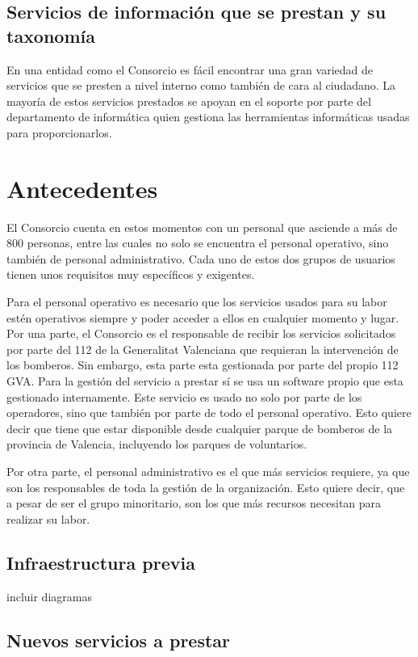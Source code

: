 \documentclass[12pt,a4paper,titlepage,twoside]{report}
\begin{document}
\section{Servicios de información que se prestan y su taxonomía}
En una entidad como el Consorcio es fácil encontrar una gran variedad de servicios que se presten a nivel interno como también de cara al ciudadano. La mayoría de estos servicios prestados se apoyan en el soporte por parte del departamento de informática quien gestiona las herramientas informáticas usadas para proporcionarlos.

\chapter{Antecedentes}
El Consorcio cuenta en estos momentos con un personal que asciende a más de 800 personas, entre las cuales no solo se encuentra el personal operativo, sino también de personal administrativo. Cada uno de estos dos grupos de usuarios tienen unos requisitos muy específicos y exigentes. 
\par
Para el personal operativo es necesario que los servicios usados para su labor estén operativos siempre y poder acceder a ellos en cualquier momento y lugar. Por una parte, el Consorcio es el responsable de recibir los servicios solicitados por parte del 112 de la Generalitat Valenciana que requieran la intervención de los bomberos. Sin embargo, esta parte esta gestionada por parte del propio 112 GVA. Para la gestión del servicio a prestar sí se usa un software propio que esta gestionado internamente. Este servicio es usado no solo por parte de los operadores, sino que también por parte de todo el personal operativo. Esto quiere decir que tiene que estar disponible desde cualquier parque de bomberos de la provincia de Valencia, incluyendo los parques de voluntarios.
\par
Por otra parte, el personal administrativo es el que más servicios requiere, ya que son los responsables de toda la gestión de la organización. Esto quiere decir, que a pesar de ser el grupo minoritario, son los que más recursos necesitan para realizar su labor.
\section{Infraestructura previa}
incluir diagramas
\section{Nuevos servicios a prestar}
\end{document}
